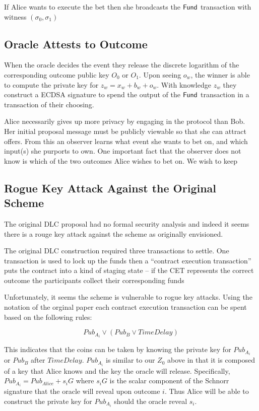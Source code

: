 \documentclass{article}
\theoremstyle{definition}
\begin{document}
  If Alice wants to execute the bet then she broadcasts the $\textsf{Fund}$ transaction with witness $(\sigma_0, \sigma_1)$


\subsection{Oracle Attests to Outcome}

When the oracle decides the event they release the discrete logarithm of the corresponding outcome public key $O_0$ or $O_1$. Upon seeing $o_w$, the winner is able to compute the private key for $z_w = x_w + b_w + o_w$. With knowledge $z_w$ they construct a ECDSA signature to spend the output of the $\textsf{Fund}$ transaction in a transaction of their choosing.



Alice necessarily gives up more privacy by engaging in the protocol than Bob. Her initial proposal message must be publicly viewable so that she can attract offers. From this an observer learns what event she wants to bet on, and which input(s) she purports to own. One important fact that the observer does not know is which of the two outcomes Alice wishes to bet on. We wish to keep


\subsection{Rogue Key Attack Against the Original Scheme}

The original DLC proposal had no formal security analysis and indeed it seems there is a rouge key attack against the scheme as originally envisioned.


The original DLC construction required three transactions to settle. One transaction is used to lock up the funds then a ``contract execution transaction'' puts the contract into a kind of staging state -- if the CET represents the correct outcome the participants collect their corresponding funds

Unfortunately, it seems the scheme is vulnerable to rogue key attacks. Using the notation of the orginal paper each contract execution transaction can be spent based on the following rules:

\[ Pub_{A_i} \lor (Pub_B \lor TimeDelay) \]

This indicates that the coins can be taken by knowing the private key for $Pub_{A_i}$ or $Pub_B$ after $TimeDelay$. $Pub_{A_i}$ is similar to our $Z_0$ above in that it is composed of a key that Alice knows and the key the oracle will release. Specifically, $Pub_{A_i} = Pub_{Alice} + s_iG$ where $s_iG$ is the scalar component of the Schnorr signature that the oracle will reveal upon outcome $i$. Thus Alice will be able to construct the private key for $Pub_{A_i}$ should the oracle reveal $s_i$.
\end{document}
